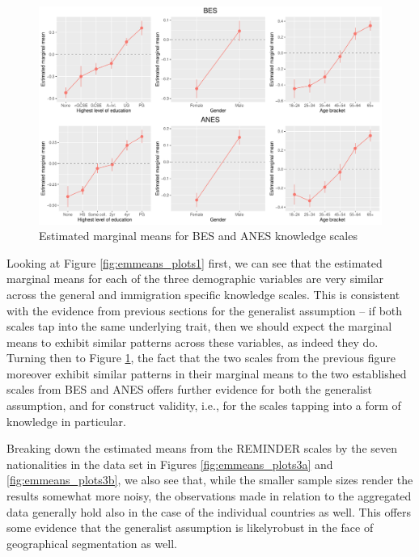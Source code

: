 \documentclass[11pt,halfline,a4paper,]{ouparticle}
\begin{document}
\begin{figure}[!h]
\includegraphics[width=1\linewidth]{Revisiting-the-Measurement-and-Dimensionality-of-Political-Knowledge--Evidence-from-Seven-European-Countries_files/figure-latex/emmeans_plots2-1} \caption{Estimated marginal means for BES and ANES knowledge scales}\label{fig:emmeans_plots2}
\end{figure}

Looking at Figure \ref{fig:emmeans_plots1} first, we can see that the
estimated marginal means for each of the three demographic variables are
very similar across the general and immigration specific knowledge
scales. This is consistent with the evidence from previous sections for
the generalist assumption -- if both scales tap into the same underlying
trait, then we should expect the marginal means to exhibit similar
patterns across these variables, as indeed they do. Turning then to
Figure \ref{fig:emmeans_plots2}, the fact that the two scales from the
previous figure moreover exhibit similar patterns in their marginal
means to the two established scales from BES and ANES offers further
evidence for both the generalist assumption, and for construct validity,
i.e., for the scales tapping into a form of knowledge in particular.

Breaking down the estimated means from the REMINDER scales by the seven
nationalities in the data set in Figures \ref{fig:emmeans_plots3a} and
\ref{fig:emmeans_plots3b}, we also see that, while the smaller sample
sizes render the results somewhat more noisy, the observations made in
relation to the aggregated data generally hold also in the case of the
individual countries as well. This offers some evidence that the
generalist assumption is likelyrobust in the face of geographical
segmentation as well.
\end{document}
